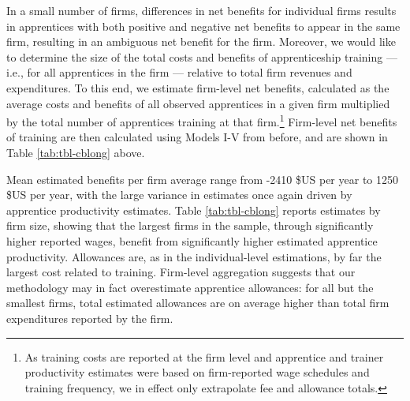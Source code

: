 \documentclass[
  a4paper, twoside, 12pt]{book}
\begin{document}
In a small number of firms, differences in net benefits for individual firms results in apprentices with both positive and negative net benefits to appear in the same firm, resulting in an ambiguous net benefit for the firm. Moreover, we would like to determine the size of the total costs and benefits of apprenticeship training --- i.e., for all apprentices in the firm --- relative to total firm revenues and expenditures. To this end, we estimate firm-level net benefits, calculated as the average costs and benefits of all observed apprentices in a given firm multiplied by the total number of apprentices training at that firm.\footnote{As training costs are reported at the firm level and apprentice and trainer productivity estimates were based on firm-reported wage schedules and training frequency, we in effect only extrapolate fee and allowance totals.} Firm-level net benefits of training are then calculated using Models I-V from before, and are shown in Table \ref{tab:tbl-cblong} above.

Mean estimated benefits per firm average range from -2410 \$US per year to 1250 \$US per year, with the large variance in estimates once again driven by apprentice productivity estimates. Table \ref{tab:tbl-cblong} reports estimates by firm size, showing that the largest firms in the sample, through significantly higher reported wages, benefit from significantly higher estimated apprentice productivity. Allowances are, as in the individual-level estimations, by far the largest cost related to training. Firm-level aggregation suggests that our methodology may in fact overestimate apprentice allowances: for all but the smallest firms, total estimated allowances are on average higher than total firm expenditures reported by the firm.
\end{document}
